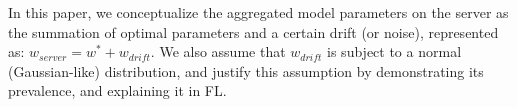 


In this paper, we conceptualize the aggregated model parameters on the server as the summation of optimal parameters and a certain drift (or noise), represented as: $w_{server}=w^*+w_{drift}$. We also assume that $w_{drift}$ is subject to a normal (Gaussian-like) distribution, and justify this assumption by demonstrating its prevalence, and explaining it in FL.

